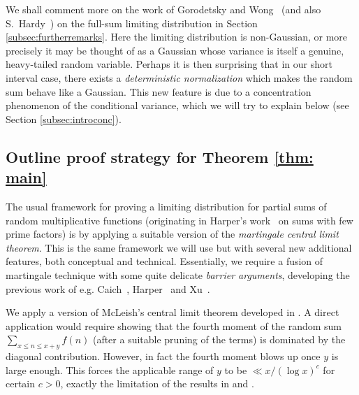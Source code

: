 \documentclass[12pt, notitlepage]{amsart}
\numberwithin{equation}{section}
\theoremstyle{remark}
\theoremstyle{definition}
\theoremstyle{remark}
\numberwithin{equation}{section}
\begin{document}
We shall comment more on the work of Gorodetsky and Wong~\cite{GW-Final} (and also S.~Hardy~\cite{hardy}) on the full-sum limiting distribution in Section \ref{subsec:furtherremarks}. Here the limiting distribution is non-Gaussian, or more precisely it may be thought of as a Gaussian whose variance is itself a genuine, heavy-tailed random variable. Perhaps it is then surprising that in our short interval case, there exists a \textit{deterministic normalization} which makes the random sum behave like a Gaussian. This new feature is due to a concentration phenomenon of the conditional variance, which we will try to explain below (see Section \ref{subsec:introconc}).

\subsection{Outline proof strategy for Theorem \ref{thm: main}}\label{hsubsecoutline}
The usual framework for proving a limiting distribution for partial sums of random multiplicative functions (originating in Harper's work~\cite{Harper} on sums with few prime factors) is by applying a suitable version of the {\em martingale central limit theorem}. This is the same framework we will use but with several new additional features, both conceptual and technical. Essentially, we require a fusion of martingale technique with some quite delicate {\em barrier arguments}, developing the previous work of e.g. Caich~\cite{caichshort}, Harper~\cite{HarperLow, Harperlargevalue} and Xu~\cite{Xu}.

We apply a version of McLeish's central limit theorem \cite{McLeish} developed in \cite{SoundXu}. A direct application would require showing that the fourth moment of the random sum  $\sum_{x\le n \le x+y}f(n)$ (after a suitable pruning of the terms) is dominated by the diagonal contribution.  However, in fact the fourth moment blows up once $y$ is large enough. This forces the applicable range of $y$ to be $\ll  x/(\log x)^{c}$ for certain $c>0$, exactly the limitation of the results in \cite{CS} and \cite{SoundXu}. 
\end{document}
